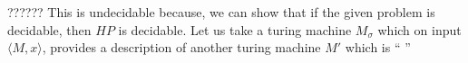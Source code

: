 ??????
\newline
This is undecidable because, we can show that if the given problem is decidable, then $HP$ is decidable.
Let us take a turing machine $M_\sigma$ which on input $\langle M, x \rangle$, provides a description of another turing machine $M'$ which is 
``
''




